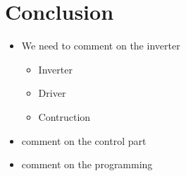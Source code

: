 \section{Conclusion}

\begin{itemize}
    \item We need to comment on the inverter
        \begin{itemize}
            \item Inverter
            \item Driver
            \item Contruction
        \end{itemize}
    \item comment on the control part
        
    \item comment on the programming

\end{itemize}